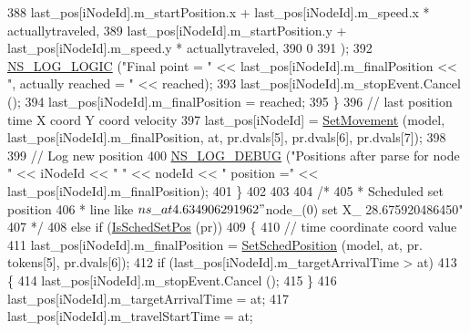 \begin{DoxyCode}
388                           last\_pos[iNodeId].m\_startPosition.x + last\_pos[iNodeId].m\_speed.x * 
      actuallytraveled,
389                           last\_pos[iNodeId].m\_startPosition.y + last\_pos[iNodeId].m\_speed.y * 
      actuallytraveled,
390                           0
391                           );
392                       \hyperlink{group__logging_ga88acd260151caf2db9c0fc84997f45ce}{NS\_LOG\_LOGIC} (\textcolor{stringliteral}{"Final point = "} << last\_pos[iNodeId].m\_finalPosition << \textcolor{stringliteral}{",
       actually reached = "} << reached);
393                       last\_pos[iNodeId].m\_stopEvent.Cancel ();
394                       last\_pos[iNodeId].m\_finalPosition = reached;
395                     \}
396                   \textcolor{comment}{//                                     last position     time  X coord     Y coord     
       velocity}
397                   last\_pos[iNodeId] = \hyperlink{namespacens3_acdd6ecb3571f04192019c1afc1b935bd}{SetMovement} (model, last\_pos[iNodeId].m\_finalPosition, at,
       pr.dvals[5], pr.dvals[6], pr.dvals[7]);
398 
399                   \textcolor{comment}{// Log new position}
400                   \hyperlink{group__logging_ga413f1886406d49f59a6a0a89b77b4d0a}{NS\_LOG\_DEBUG} (\textcolor{stringliteral}{"Positions after parse for node "} << iNodeId << \textcolor{stringliteral}{" "} << nodeId 
      << \textcolor{stringliteral}{" position ="} << last\_pos[iNodeId].m\_finalPosition);
401                 \}
402 
403 
404               \textcolor{comment}{/*}
405 \textcolor{comment}{               * Scheduled set position}
406 \textcolor{comment}{               * line like $ns\_ at 4.634906291962 "$node\_(0) set X\_ 28.675920486450"}
407 \textcolor{comment}{               */}
408               \textcolor{keywordflow}{else} \textcolor{keywordflow}{if} (\hyperlink{namespacens3_ae70eba6d6fbf3bb4fa349cc82df28f57}{IsSchedSetPos} (pr))
409                 \{
410                   \textcolor{comment}{//                                         time  coordinate   coord value}
411                   last\_pos[iNodeId].m\_finalPosition = \hyperlink{namespacens3_ad0171060956d13fe6e048a14e04daea4}{SetSchedPosition} (model, at, pr.
      tokens[5], pr.dvals[6]);
412                   \textcolor{keywordflow}{if} (last\_pos[iNodeId].m\_targetArrivalTime > at)
413                     \{
414                       last\_pos[iNodeId].m\_stopEvent.Cancel ();
415                     \}
416                   last\_pos[iNodeId].m\_targetArrivalTime = at;
417                   last\_pos[iNodeId].m\_travelStartTime = at;

\end{DoxyCode}
